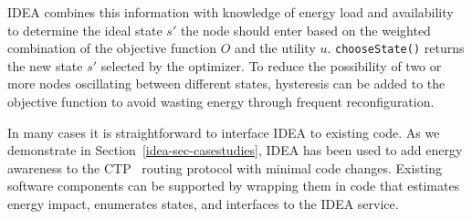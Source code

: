 IDEA combines this information with knowledge of energy load and availability
to determine the ideal state $s'$ the node should enter based on the weighted
combination of the objective function $O$ and the utility $u$.
\texttt{chooseState()} returns the new state $s'$ selected by the optimizer.
To reduce the possibility of two or more nodes oscillating between different
states, hysteresis can be added to the objective function to avoid wasting
energy through frequent reconfiguration.

In many cases it is straightforward to interface IDEA to existing code. As we
demonstrate in Section~\ref{idea-sec-casestudies}, IDEA has been used to add
energy awareness to the CTP~\cite{ctp-sensys09} routing protocol with minimal
code changes. Existing software components can be supported by wrapping them
in code that estimates energy impact, enumerates states, and interfaces to
the IDEA service.
